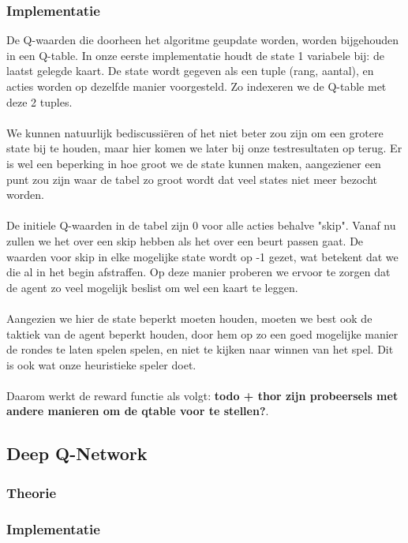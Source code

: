 \documentclass[11pt]{article}
\begin{document}
\subsubsection{Implementatie}
De Q-waarden die doorheen het algoritme geupdate worden, worden bijgehouden in een Q-table. In onze eerste implementatie houdt de state 1 variabele bij: de laatst gelegde kaart. De state wordt gegeven als een tuple (rang, aantal), en acties worden op dezelfde manier voorgesteld. Zo indexeren we de Q-table met deze 2 tuples. \\\\
We kunnen natuurlijk bediscussiëren of het niet beter zou zijn om een grotere state bij te houden, maar hier komen we later bij onze testresultaten op terug. Er is wel een beperking in hoe groot we de state kunnen maken, aangeziener een punt zou zijn waar de tabel zo groot wordt dat veel states niet meer bezocht worden. \\\\
De initiele Q-waarden in de tabel zijn 0 voor alle acties behalve "skip". Vanaf nu zullen we het over een skip hebben als het over een beurt passen gaat. De waarden voor skip in elke mogelijke state wordt op -1 gezet, wat betekent dat we die al in het begin afstraffen. Op deze manier proberen we ervoor te zorgen dat de agent zo veel mogelijk beslist om wel een kaart te leggen. \\\\
Aangezien we hier de state beperkt moeten houden, moeten we best ook de taktiek van de agent beperkt houden, door hem op zo een goed mogelijke manier de rondes te laten spelen spelen, en niet te kijken naar winnen van het spel. Dit is ook wat onze heuristieke speler doet.\\\\
Daarom werkt de reward functie als volgt: \textbf{todo + thor zijn probeersels met andere manieren om de qtable voor te stellen?}.

\subsection{Deep Q-Network}
\subsubsection{Theorie}


\subsubsection{Implementatie}
\end{document}
